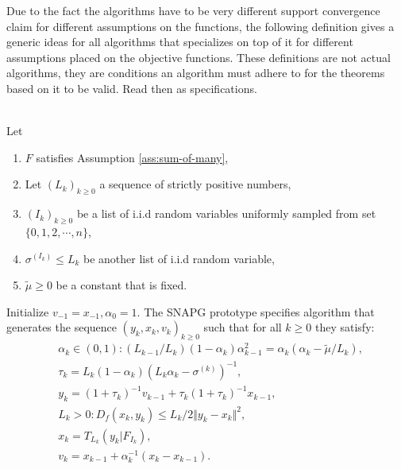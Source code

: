 \documentclass[12pt]{article}
\begin{document}
    Due to the fact the algorithms have to be very different support convergence claim for different assumptions on the functions, the following definition gives a generic ideas for all algorithms that specializes on top of it for different assumptions placed on the objective functions. 
    These definitions are not actual algorithms, they are conditions an algorithm must adhere to for the theorems based on it to be valid. 
    Read then as specifications. 
    \begin{definition}\;\label{def:snapg-v2-proto}\\
        Let 
        \begin{enumerate}[nosep]
            \item $F$ satisfies Assumption \ref{ass:sum-of-many}, 
            \item Let $(L_k)_{k \ge 0}$ a sequence of strictly positive numbers, 
            \item $(I_k)_{k \ge 0}$ be a list of i.i.d random variables uniformly sampled from set $\{0, 1, 2, \cdots, n\}$, 
            \item $\sigma^{(I_k)} \le L_k$ be another list of i.i.d random variable, 
            \item $\tilde \mu \ge 0$ be a constant that is fixed.
        \end{enumerate}
        Initialize $v_{-1} = x_{-1}, \alpha_0 = 1$. 
        The SNAPG prototype specifies algorithm that generates the sequence $(y_k, x_k, v_k)_{k \ge 0}$ such that for all $k \ge 0$ they satisfy: 
        \begin{align*}
            & \alpha_k \in (0, 1): (L_{k - 1}/L_k)(1 - \alpha_{k})\alpha_{k - 1}^2 = \alpha_{k}\left(\alpha_{k} - \tilde \mu/L_k\right), \\
            & \tau_k = L_k(1 - \alpha_k)\left(L_k \alpha_k - \sigma^{(k)}\right)^{-1}, \\
            & y_k = (1 + \tau_k)^{-1}v_{k - 1} + \tau_k(1 + \tau_k)^{-1}x_{k - 1}, \\
            & L_k > 0: D_f(x_k, y_k) \le L_k/2\Vert y_k - x_k\Vert^2, \\
            & x_k =  T_{L_k}(y_k | F_{I_k}), \\
            & v_k = x_{k - 1} + \alpha_k^{-1}(x_k - x_{k - 1}). 
        \end{align*}
    \end{definition}
\end{document}
